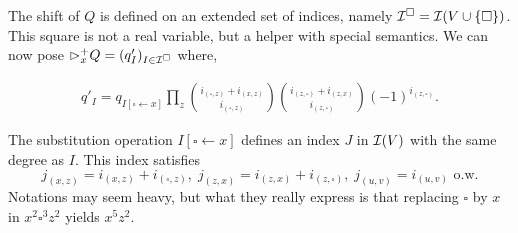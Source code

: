 \documentclass[nocopyrightspace,preprint]{sigplanconf-pldi15}
\begin{document}
The shift of $Q$ is defined on an extended set of indices, namely
$\mathcal{I}^\square = \mathcal{I}(V \cup \{\square\})$.  This square is not a real
variable, but a helper with special semantics.
We can now pose ${\rhd}_x^+ Q = (q'_I)_{I\in\mathcal{I}^\square}$ where,

\begin{align*}
q'_I =
q_{I[\square \gets x]}
\prod_z
   \binom{i_{(\square,z)} {+} i_{(x,z)}}{i_{(\square,z)}}
   \binom{i_{(z,\square)} {+} i_{(z,x)}}{i_{(z,\square)}}
   (-1)^{i_{(z,\square)}}
   .
\end{align*}

The substitution operation $I[\square \gets x]$ defines an index $J$
in $\mathcal{I}(V)$ with the same degree as $I$.  This index satisfies
$$
j_{(x,z)} {=} i_{(x,z)} {+} i_{(\square,z)}, \;
j_{(z,x)} {=} i_{(z,x)} {+} i_{(z,\square)}, \;
j_{(u,v)} {=} i_{(u,v)} \mbox{ o.w.}
$$
Notations may seem heavy, but what they really express is that
replacing $\square$ by $x$ in $x^2\square^3z^2$ yields $x^5z^2$.
\end{document}
